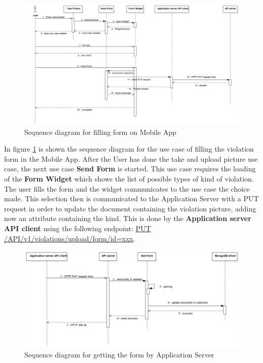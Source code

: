 \begin{figure}[H]
\centering
\includegraphics[width=\textwidth]{Images/DDSeqAppForm.png}
\caption{\label{fig:DDSeqAppForm} Sequence diagram for filling form on Mobile App}
\end{figure}
In figure \ref{fig:DDSeqAppForm} is shown the sequence diagram for the use case of filling the violation form in the Mobile App.
After the User has done the take and upload picture use case, the next use case \textbf{Send Form} is started. This use case requires the loading of the \textbf{Form Widget} which shows the list of possible types of kind of violation. The user fills the form and the widget communicates to the use case the choice made. This selection then is communicated to the Application Server with a PUT request in order to update the document containing the violation picture, adding now an attribute containing the kind. This is done by the \textbf{Application server API client} using the following endpoint: \url{PUT} \url{/API/v1/violations/upload/form/id=xxx}.


\begin{figure}[H]
\centering
\includegraphics[width=\textwidth]{Images/DDSeqSeverForm.png}
\caption{\label{fig:DDSeqSeverForm} Sequence diagram for getting the form by Application Server}
\end{figure}

